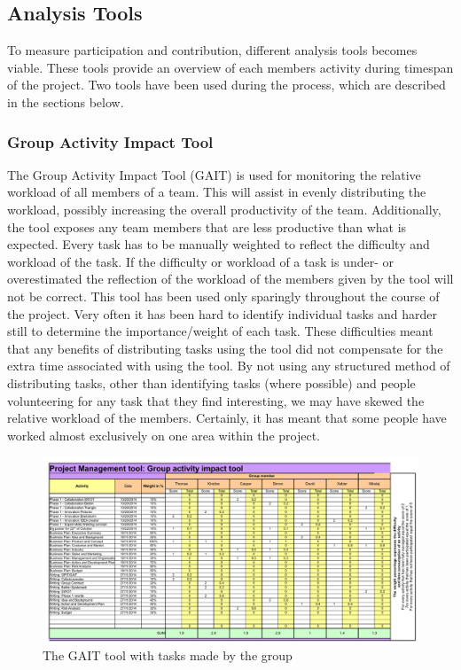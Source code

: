 \subsection{Analysis Tools}
To measure participation and contribution, different analysis tools becomes viable. These tools provide an overview of each members activity during timespan of the project. Two tools have been used during the process, which are described in the sections below.

\subsubsection{Group Activity Impact Tool}
 The Group Activity Impact Tool (GAIT) is used for monitoring the relative workload of all members of a team. This will assist in evenly distributing the workload, possibly increasing the overall productivity of the team. Additionally, the tool exposes any team members that are less productive than what is expected. Every task has to be manually weighted to reflect the difficulty and workload of the task. If the difficulty or workload of a task is under- or overestimated the reflection of the workload of the members given by the tool will not be correct.
This tool has been used only sparingly throughout the course of the project. Very often it has been hard to identify individual tasks and harder still to determine the importance/weight of each task. These difficulties meant that any benefits of distributing tasks using the tool did not compensate for the extra time associated with using the tool. 
 By not using any structured method of distributing tasks, other than identifying tasks (where possible) and people volunteering for any task that they find interesting, we may have skewed the relative workload of the members. Certainly, it has meant that some people have worked almost exclusively on one area within the project.
\begin{landscape}
	\begin{figure}[h!]
		\includegraphics[scale=1.25]{./graphics/GAIT}
		\caption{The GAIT tool with tasks made by the group}
		\label{fig:GAIT}
	\end{figure}
\end{landscape}


